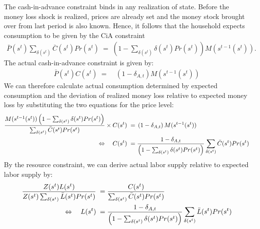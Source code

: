 \documentclass[a4paper, 12pt]{article}
\begin{document}
\begin{Answer}
	The cash-in-advance constraint binds in any realization of state. Before the money loss shock is realized, prices are already set and the money stock brought over from last period is also known. Hence, it follows that the household expects consumption to be given by the CiA constraint
	\begin{align*}%
		\bar{P}(s^t) \sum_{\delta(s^t)} \bar{C}(s^t) Pr(s^t) \; = \; \left(1-\sum_{\delta(s^t)} \delta(s^t) Pr(s^t)\right) M(s^{t-1}(s^t)).%
	\end{align*}%
	The actual cash-in-advance constraint is given by:%
	\begin{align*}%
		\bar{P}(s^t) C(s^t) \; = & \; \left( 1-\delta_{A,t} \right) M(s^{t-1}(s^t))%
	\end{align*}%
	We can therefore calculate actual consumption determined by expected consumption and the deviation of realized money loss relative to expected money loss by substituting the two equations for the price level:%
	\begin{align}%
		\frac{M(s^{t-1}(s^t)) \left(1-\sum_{\delta(s^t)} \delta(s^t) Pr(s^t)\right)}{\sum_{\delta(s^t)} \bar{C}(s^t) Pr(s^t)} \times C(s^t) \; = & \; \left( 1-\delta_{A,t} \right) M(s^{t-1}(s^t))\notag\\%
		\Leftrightarrow \quad C(s^t) \; = & \; \frac{1-\delta_{A,t}}{\left(1-\sum_{\delta(s^t)} \delta(s^t) Pr(s^t) \right)} \sum_{\delta(s^t)} \bar{C}(s^t) Pr(s^t)%
	\end{align}%
	By the resource constraint, we can derive actual labor supply relative to expected labor supply by:%
	\begin{align}%
		\frac{Z(s^t) L(s^t)}{Z(s^t)\sum_{\delta(s^t)} \bar{L}(s^t) Pr(s^t)} \; = & \; \frac{C(s^t)}{\sum_{\delta(s^t)} \bar{C}(s^t) Pr(s^t)}\notag\\%
		\Leftrightarrow \quad L(s^t) \; = & \; \frac{1-\delta_{A,t}}{\left(1-\sum_{\delta(s^t)} \delta(s^t) Pr(s^t)\right)} \sum_{\delta(s^t)} \bar{L}(s^t) Pr(s^t)%
	\end{align}%
\end{Answer}%
\bigskip%
\end{document}
